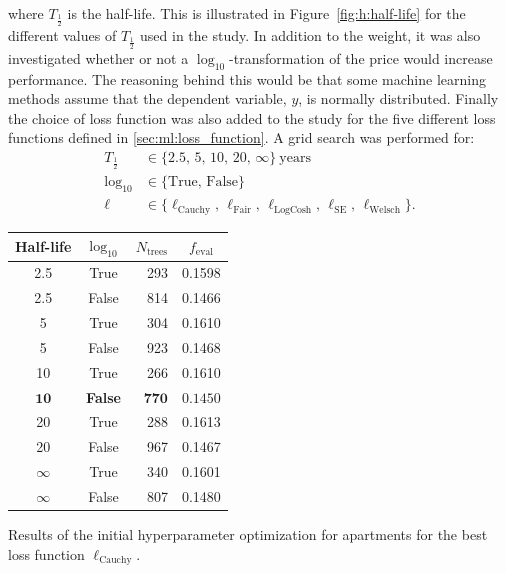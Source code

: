 \noindent where $T_{\frac{1}{2}}$ is the half-life. This is illustrated in Figure~\ref{fig:h:half-life} for the different values of $T_{\frac{1}{2}}$ used in the study.  In addition to the weight, it was also investigated whether or not a $\log_{10}$-transformation of the price would increase performance. The reasoning behind this would be that some machine learning methods assume that the dependent variable, $y$, is normally distributed. Finally the choice of loss function was also added to the study for the five different loss functions defined in \autoref{sec:ml:loss_function}. A grid search was performed for:
\begin{equation}
  \begin{split}
    T_{\frac{1}{2}} &\in \{2.5,\, 5,\, 10,\, 20,\, \infty \}~\mathrm{ years} \\
    \log_{10} &\in \{\mathrm{True},\, \mathrm{False} \} \\
    \ell &\in \{ \ell_\mathrm{Cauchy},\, \ell_\mathrm{Fair},\, \ell_\mathrm{LogCosh},\, \ell_\mathrm{SE},\, \ell_\mathrm{Welsch}\}.
  \end{split}
\end{equation}

\begin{margintable}[-1cm]
  \begin{tabular}{@{}ccrc@{}}
    Half-life & $\log_{10}$ & $N_\mathrm{trees}$ & $f_\mathrm{eval}$ \\
    \midrule
    \num{2.5} & True & \num{293} & \num{0.1598} \\
    \num{2.5} & False & \num{814} & \num{0.1466} \\
    \num{5} & True & \num{304} & \num{0.1610} \\
    \num{5} & False & \num{923} & \num{0.1468} \\
    \num{10} & True & \num{266} & \num{0.1610} \\
    $\mathbf{10}$ & \textbf{False} & $\mathbf{770}$ & $\mathbf{0.1450}$ \\
    \num{20} & True & \num{288} & \num{0.1613} \\
    \num{20} & False & \num{967} & \num{0.1467} \\
    $\infty$ & True & \num{340} & \num{0.1601} \\
    $\infty$ & False & \num{807} & \num{0.1480} \\
  \end{tabular}
  \vspace{3mm}
  \caption[Results from the Initial Hyperparameter Optimization for Apartments]{\label{tab:h:HPO_initial_Cauchy-ejerlejlighed}Results of the initial hyperparameter optimization for apartments for the best loss function $\ell_\mathrm{Cauchy}$.}
\end{margintable}


